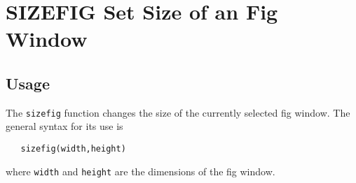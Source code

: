 \section{SIZEFIG Set Size of an Fig Window}

\subsection{Usage}

The \verb|sizefig| function changes the size of the currently
selected fig window.  The general syntax for its use is
\begin{verbatim}
   sizefig(width,height)
\end{verbatim}
where \verb|width| and \verb|height| are the dimensions of the fig
window.
